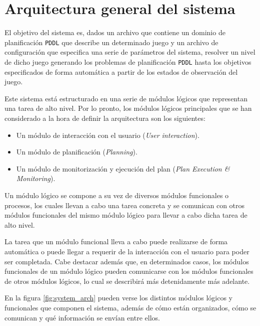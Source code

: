 
\chapter{Arquitectura general del sistema}
\label{chap:arch}

El objetivo del sistema es, dados un archivo que contiene un dominio de planificación \texttt{PDDL}
que describe un determinado juego y un archivo de configuración que especifica una serie de parámetros
del sistema, resolver un nivel de dicho juego generando los problemas de planificación
\texttt{PDDL} hasta los objetivos especificados de forma automática a partir de los estados de observación
del juego.

Este sistema está estructurado en una serie de módulos lógicos que representan una
tarea de alto nivel. Por lo pronto, los módulos lógicos principales que se han considerado a la hora de definir
la arquitectura son los siguientes:

\begin{itemize}[label=\textbullet]
    \item Un módulo de interacción con el usuario (\textit{User interaction}).
    \item Un módulo de planificación (\textit{Planning}).
    \item Un módulo de monitorización y ejecución del plan (\textit{Plan Execution \& Monitoring}).
\end{itemize}

Un módulo lógico se compone a su vez de diversos módulos funcionales o procesos, los cuales llevan a cabo
una tarea concreta y se comunican con otros módulos funcionales del mismo módulo lógico para llevar a cabo
dicha tarea de alto nivel.

La tarea que un módulo funcional lleva a cabo puede realizarse de forma automática o
puede llegar a requerir de la interacción con el usuario para poder ser completada.
Cabe destacar además que, en determinados casos, los módulos funcionales de un módulo
lógico pueden comunicarse con los módulos funcionales de otros módulos lógicos, lo cual se
describirá más detenidamente más adelante.

En la figura \ref{fig:system_arch} pueden verse los distintos módulos lógicos y funcionales que
componen el sistema, además de cómo están organizados, cómo se comunican y qué información se
envían entre ellos.

